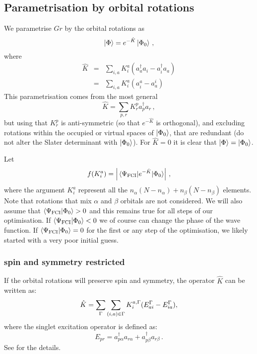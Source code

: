 \subsection{Parametrisation by orbital rotations}
We parametrise $Gr$ by the orbital rotations as\cite{}
\begin{equation}
  \ket{\Phi} = e^{-\hat{K}} \ket{\Phi_0}\,,
\end{equation}
where
\begin{eqnarray}
  \hat{K} &=& \sum_{i,a} K_i^a(a_a^\dagger a_i - a_i^\dagger a_a)\\
          &=& \sum_{i,a} K_i^a(a_i^a - a_a^i)\,
\end{eqnarray}
This parametrisation comes from the most general 
\begin{equation}
  \hat{K} = \sum_{p,r} K_r^pa_p^\dagger a_r\,,
\end{equation}
but using that $K_r^p$ is anti-symmetric (so that $e^{-\hat{K}}$ is orthogonal), and excluding rotations within the occupied or virtual spaces of $\ket{\Phi_0}$, that are redundant (do not alter the Slater determinant with $\ket{\Phi_0}$).
For $\hat{K} = 0$ it is clear that $\ket{\Phi} = \ket{\Phi_0}$.

Let
\begin{equation}
  f(K_i^a) = \left|\mel{\Psi_\text{FCI}}{e^{-\hat{K}}}{\Phi_0}\right|\,,
\end{equation}
where the argument $K_i^a$ represent all the $n_\alpha(N-n_\alpha) + n_\beta(N-n_\beta)$ elements.
Note that rotations that mix $\alpha$ and $\beta$ orbitals are not considered.
We will also assume that $\innerproduct{\Psi_\text{FCI}}{\Phi_0} > 0$ and this remains true for all steps
of our optimisation.
If $\innerproduct{\Psi_\text{FCI}}{\Phi_0} < 0$ we of course can change the phase of the wave function.
If $\innerproduct{\Psi_\text{FCI}}{\Phi_0} = 0$ for the first or any step of the optimisation, we likely started with a very poor initial guess.

\subsubsection{spin and symmetry restricted}

If the orbital rotations will preserve spin and symmetry, the operator $\hat{K}$ can be written as:
\begin{equation}
  \hat{K} = \sum_{\Gamma} \sum_{(i,a) \in \Gamma} K_i^{a,\Gamma}(E_{ai}^{\Gamma} - E_{ia}^{\Gamma}),
\end{equation}
where the singlet excitation operator is defined as:
\begin{equation}
  E_{pr} = a_{p\alpha}^\dagger a_{r\alpha} + a_{p\beta}^\dagger a_{r\beta}\,.
\end{equation}
See \cite{helgaker00_molec} for the details.


